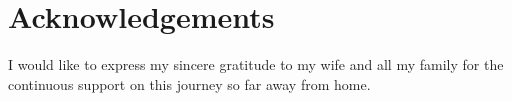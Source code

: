 \chapter*{Acknowledgements}

I would like to express my sincere gratitude to my wife and all my family for the continuous support on this journey so far away from home.


